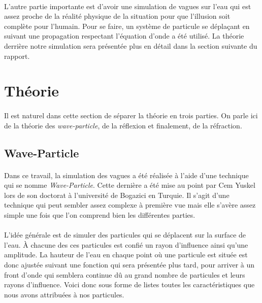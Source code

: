\documentclass[a4paper, 12pt]{article} %
\begin{document}
    \paragraph{}
    L'autre partie importante est d'avoir une simulation de vagues sur l'eau qui est assez
    proche de la réalité physique de la situation pour que l'illusion soit complète pour 
    l'humain. Pour se faire, un système de particule se déplaçant en suivant une propagation
    respectant l'équation d'onde a été utilisé. La théorie derrière notre simulation sera 
    présentée plus en détail dans la section
    suivante du rapport.

\section{Théorie}
    \paragraph{}
    Il est naturel dans cette section de séparer la théorie en trois parties.
    On parle ici de la théorie des \textit{wave-particle}, de la réflexion et finalement,
    de la réfraction.

    \subsection{Wave-Particle}
        \paragraph{}
    	Dans ce travail, la simulation des vagues a été réalisée à l'aide d'une technique
	qui se nomme \textit{Wave-Particle}. Cette dernière a été mise au point par Cem
	Yuskel lors de son doctorat à l'université de Bogazici en Turquie.\cite{Yuskel}
	Il s'agit d'une technique qui peut sembler assez complexe à première vue mais elle
	s'avère assez simple une fois que l'on comprend bien les différentes parties.

        \paragraph{}
	L'idée générale est de simuler des particules qui se déplacent sur la surface de l'eau.
	À chacune des ces particules est confié un rayon d'influence ainsi qu'une amplitude.
	La hauteur de l'eau en chaque point où une particule est située est donc ajustée 
	suivant une fonction qui sera présentée plus tard, pour arriver à un front d'onde
	qui semblera continue dû au grand nombre de particules et leurs rayons d'influence.
	Voici donc sous forme de listes toutes les caractéristiques que nous avons attribuées
	à nos particules.
\end{document}
